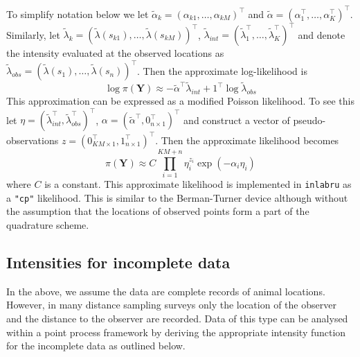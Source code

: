 \documentclass[preprint,12pt]{elsarticle}
\newcommand{\bm}{\boldsymbol}  %
\newcommand{\tl}{\tilde{\lambda}}   %
\begin{document}
To simplify notation below we let $\tilde{\alpha}_{k} = (\alpha_{k1}, \ldots, \alpha_{kM})^\intercal$ and $\tilde{\alpha} = (\alpha_1^\intercal, \ldots, \alpha_K^\intercal)^\intercal$.  Similarly, let $\tl_k = (\tl(s_{k1}), \ldots, \tl(s_{kM}))^\intercal$, $\tl_{int} = (\tl_1^\intercal, \ldots, \tl_K^\intercal)^\intercal$ and denote the intensity evaluated at the observed locations as $\tl_{obs} = (\tl(s_1), \ldots, \tl(s_n))^\intercal$.  Then the approximate log-likelihood is
\begin{equation}
\label{approx-log-likelihood}
	\log \pi(\bm{Y}) \approx - \tilde{\alpha}^\intercal \tl_{int} + 1^\intercal\log\tl_{obs}
\end{equation}
This approximation can be expressed as a modified Poisson likelihood.  To see this let $\eta = (\tl_{int}^\intercal, \tl_{obs}^\intercal)^\intercal$,
$\alpha = (\tilde{\alpha}^\intercal, 0_{n \times 1}^\intercal)^\intercal$ and construct a vector of pseudo-observations $z = (0_{KM\times 1}^\intercal, 1_{n \times 1}^\intercal)^\intercal$.  Then the approximate likelihood becomes
\begin{equation}
\pi(\bm{Y}) \approx C \prod\limits_{i=1}^{KM + n} \eta_i^{z_i}\exp(-\alpha_i\eta_i)
\end{equation}
where $C$ is a constant.  This approximate likelihood is implemented in \texttt{inlabru} as a \texttt{"cp"} likelihood.  This is similar to the Berman-Turner device \citep{berman_approximating_1992, baddeley_practical_2000} although without the assumption that the locations of observed points form a part of the quadrature scheme.

\subsection{Intensities for incomplete data}

In the above, we assume the data are complete records of animal locations.  However, in many distance sampling surveys only the location of the observer and the distance to the observer are recorded.  Data of this type can be analysed within a point process framework by deriving the appropriate intensity function for the incomplete data as outlined below.
\end{document}
